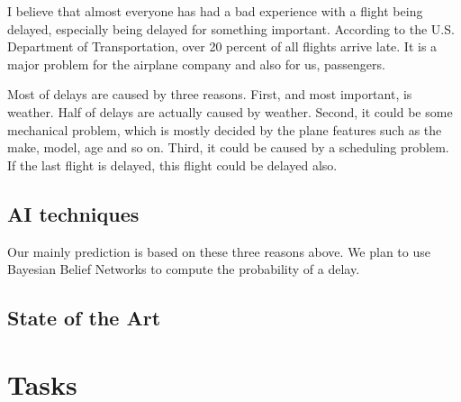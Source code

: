 \documentclass[12pt]{article}
\begin{document}
I believe that almost everyone has had a bad experience with a flight being 
delayed, especially being delayed for something important. According to the
U.S. Department of Transportation, over 20 percent of all flights arrive late.\cite{4732894} 
It is a major problem for the airplane company and also for us, passengers. 

Most of delays are caused by three reasons. First, and most important, is 
weather. Half of delays are actually caused by weather\cite{5655493}. Second, it could 
be some mechanical problem, which is mostly decided by the plane
features such as the make, model, age and so on. Third, it could be
caused by a scheduling problem. If the last flight is delayed, this flight 
could be delayed also. \cite{6891588}





\subsection{AI techniques}


Our mainly prediction is based on these three reasons above. 
We plan to use Bayesian Belief Networks to compute the probability of a delay.




\subsection{State of the Art}





\section{Tasks}

\end{document}
